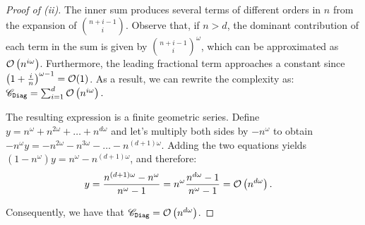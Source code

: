 \begin{proof}[Proof of  (ii)]
The inner sum produces several terms of different orders in $n$ from the expansion of $\binom{n+i-1}{i}$. Observe that, if $n>d$, the dominant contribution of each term in the sum is given by $\binom{n+i-1}{i}^\omega$, which can be approximated as $\mathcal{O}\left(n^{i\omega}\right)$. Furthermore, the leading fractional term approaches a constant since ${\left(1 + \frac{i}{n}\right)}^{\omega-1} = \mathcal{O}(1)$. 
As a result, we can rewrite the complexity as:
$
\mathscr{C}_{\texttt{Diag}} = \sum_{i=1}^{d} \mathcal{O}\left(n^{i\omega}\right).
$

The resulting expression is a finite geometric series. Define $y = n^\omega + n^{2\omega} + \dots + n^{d\omega}$ and let's multiply both sides by $-n^\omega$ to obtain $-n^\omega y = -n^{2\omega} - n^{3\omega} - \dots - n^{(d+1)\omega}$.
Adding the two equations yields $(1-n^\omega)y = n^\omega - n^{(d+1)\omega}$, and therefore:
\begin{align*}
y &= \frac{n^{(d+1)\omega} - n^\omega}{n^\omega - 1} = n^\omega \frac{n^{d\omega}-1}{n^\omega-1} = \mathcal{O}\left(n^{d\omega}\right).
\end{align*}

Consequently, we have that $\mathscr{C}_{\texttt{Diag}} = \mathcal{O}\left(n^{d\omega}\right)$.


\end{proof}
